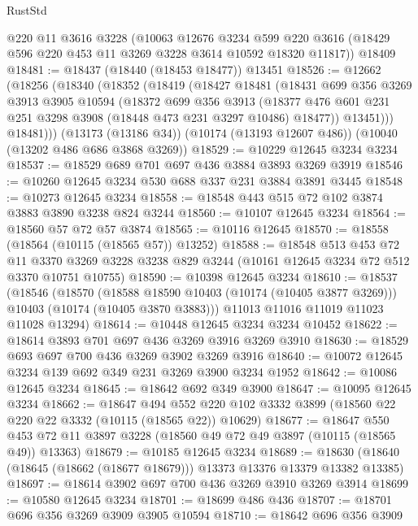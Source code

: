 \begin{lexlean}{RustStd}
\begin{coremodule}
    @220
    @11
    @3616
    @3228
    (@10063
      @12676
      @3234
      @599
      @220
      @3616
      (@18429 @596 @220 @453 @11 @3269 @3228 @3614 @10592 @18320 @11817))
    @18409
@18481 := @18437 (@18440 (@18453 @18477)) @13451
@18526 := @12662
    (@18256
      (@18340
        (@18352
          (@18419
            (@18427
              @18481
              (@18431
                @699
                @356
                @3269
                @3913
                @3905
                @10594
                (@18372
                  @699
                  @356
                  @3913
                  (@18377 @476 @601 @231 @251 @3298 @3908 (@18448 @473 @231 @3297 @10486) @18477))
                @13451)))
          @18481)))
    (@13173 (@13186 @34))
    (@10174 (@13193 @12607 @486))
    (@10040 (@13202 @486 @686 @3868 @3269))
@18529 := @10229 @12645 @3234 @3234
@18537 := @18529 @689 @701 @697 @436 @3884 @3893 @3269 @3919
@18546 := @10260 @12645 @3234 @530 @688 @337 @231 @3884 @3891 @3445
@18548 := @10273 @12645 @3234
@18558 := @18548 @443 @515 @72 @102 @3874 @3883 @3890 @3238 @824 @3244
@18560 := @10107 @12645 @3234
@18564 := @18560 @57 @72 @57 @3874
@18565 := @10116 @12645
@18570 := @18558 (@18564 (@10115 (@18565 @57)) @13252)
@18588 := @18548
    @513
    @453
    @72
    @11
    @3370
    @3269
    @3228
    @3238
    @829
    @3244
    (@10161 @12645 @3234 @72 @512 @3370 @10751 @10755)
@18590 := @10398 @12645 @3234
@18610 := @18537
    (@18546
      (@18570
        (@18588 @18590 @10403 (@10174 (@10405 @3877 @3269)))
        @10403
        (@10174 (@10405 @3870 @3883)))
      @11013
      @11016
      @11019
      @11023
      @11028
      @13294)
@18614 := @10448 @12645 @3234 @3234 @10452
@18622 := @18614 @3893 @701 @697 @436 @3269 @3916 @3269 @3910
@18630 := @18529 @693 @697 @700 @436 @3269 @3902 @3269 @3916
@18640 := @10072 @12645 @3234 @139 @692 @349 @231 @3269 @3900 @3234 @1952
@18642 := @10086 @12645 @3234
@18645 := @18642 @692 @349 @3900
@18647 := @10095 @12645 @3234
@18662 := @18647
    @494
    @552
    @220
    @102
    @3332
    @3899
    (@18560 @22 @220 @22 @3332 (@10115 (@18565 @22)) @10629)
@18677 := @18647
    @550
    @453
    @72
    @11
    @3897
    @3228
    (@18560 @49 @72 @49 @3897 (@10115 (@18565 @49)) @13363)
@18679 := @10185 @12645 @3234
@18689 := @18630 (@18640 (@18645 (@18662 (@18677 @18679))) @13373 @13376 @13379 @13382 @13385)
@18697 := @18614 @3902 @697 @700 @436 @3269 @3910 @3269 @3914
@18699 := @10580 @12645 @3234
@18701 := @18699 @486 @436
@18707 := @18701 @696 @356 @3269 @3909 @3905 @10594
@18710 := @18642 @696 @356 @3909

\end{coremodule}
\end{lexlean}

